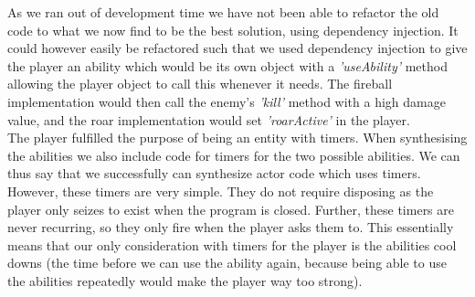 As we ran out of development time we have not been able to refactor the old code to what we now find to be the best solution, using dependency injection. It could however easily be refactored such that we used dependency injection to give the player an ability which would be its own object with a \textit{'useAbility'} method allowing the player object to call this whenever it needs. The fireball implementation would then call the enemy's \textit{'kill'} method with a high damage value, and the roar implementation would set \textit{'roarActive'} in the player.\\

The player fulfilled the purpose of being an entity with timers. When synthesising the abilities we also include code for timers for the two possible abilities. We can thus say that we successfully can synthesize actor code which uses timers. However, these timers are very simple. They do not require disposing as the player only seizes to exist when the program is closed. Further, these timers are never recurring, so they only fire when the player asks them to. This essentially means that our only consideration with timers for the player is the abilities cool downs (the time before we can use the ability again, because being able to use the abilities repeatedly would make the player way too strong).  
